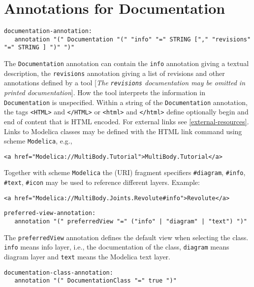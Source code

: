\section{Annotations for Documentation}

\begin{lstlisting}[language=grammar]
documentation-annotation:
   annotation "(" Documentation "(" "info" "=" STRING ["," "revisions" "=" STRING ] ")" ")"
\end{lstlisting}
The \lstinline!Documentation! annotation can contain the \lstinline!info! annotation
giving a textual description, the \lstinline!revisions! annotation giving a list
of revisions and other annotations defined by a tool {[}\emph{The
\lstinline!revisions! documentation may be omitted in printed documentation}{]}.
How the tool interprets the information in \lstinline!Documentation! is
unspecified. Within a string of the \lstinline!Documentation! annotation, the
tags \lstinline!<HTML>! and \lstinline!</HTML>! or
\lstinline!<html>! and \lstinline!</html>! define
optionally begin and end of content that is HTML encoded. For external
links see \autoref{external-resources}. Links to Modelica classes may be defined with
the HTML link command using scheme \lstinline!Modelica!, e.g.,
\begin{lstlisting}[language=modelica]
<a href="Modelica://MultiBody.Tutorial">MultiBody.Tutorial</a>
\end{lstlisting}

Together with scheme \lstinline!Modelica! the (URI) fragment specifiers
\lstinline!#diagram!, \lstinline!#info!, \lstinline!#text!, \lstinline!#icon! may be used to reference different
layers. Example:
\begin{lstlisting}[language=modelica]
<a href="Modelica://MultiBody.Joints.Revolute#info">Revolute</a>
\end{lstlisting}
\begin{lstlisting}[language=grammar]
preferred-view-annotation:
   annotation "(" preferredView "=" ("info" | "diagram" | "text") ")"
\end{lstlisting}

The \lstinline!preferredView! annotation defines the default view when selecting the
class. \lstinline!info! means info layer, i.e., the documentation of the class,
\lstinline!diagram! means diagram layer and \lstinline!text! means the Modelica text layer.
\begin{lstlisting}[language=grammar]
documentation-class-annotation:
   annotation "(" DocumentationClass "=" true ")"
\end{lstlisting}

